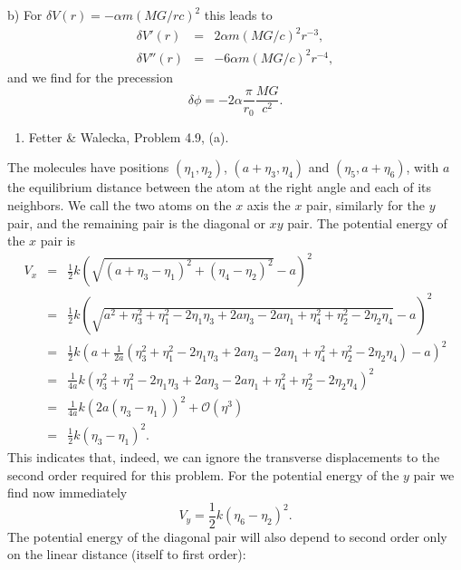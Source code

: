 \documentclass[letterpaper,11pt]{article}
\begin{document}
b) For $\delta V(r) = -\alpha m(MG/rc)^2$ this leads to
\begin{eqnarray*}
 \delta V'(r) & = & 2 \alpha m (MG/c)^2 r^{-3}, \\
 \delta V''(r) & = & - 6 \alpha m (MG/c)^2 r^{-4},
\end{eqnarray*}
and we find for the precession
\begin{equation*}
 \delta\phi = -2 \alpha \frac{\pi}{r_0} \frac{MG}{c^2}.
\end{equation*}

\begin{enumerate}[resume]
 \item Fetter \& Walecka, Problem 4.9, (a).
\end{enumerate}
The molecules have positions $(\eta_1,\eta_2)$, $(a+\eta_3,\eta_4)$ and $(\eta_5,a+\eta_6)$, with $a$ the equilibrium distance between the atom at the right angle and each of its neighbors.  We call the two atoms on the $x$ axis the $x$ pair, similarly for the $y$ pair, and the remaining pair is the diagonal or $xy$ pair.  The potential energy of the $x$ pair is
\begin{eqnarray*}
 V_x & = & \frac{1}{2} k \left( \sqrt{(a + \eta_3 - \eta_1)^2 + (\eta_4 - \eta_2)^2}  - a\right)^2 \\
   & = & \frac{1}{2} k \left( \sqrt{a^2 + \eta_3^2 + \eta_1^2 - 2\eta_1\eta_3 + 2 a \eta_3 - 2 a \eta_1 + \eta_4^2 + \eta_2^2 - 2 \eta_2 \eta_4} - a \right)^2 \\
   & = & \frac{1}{2} k \left( a + \frac{1}{2a} \left( \eta_3^2 + \eta_1^2 - 2 \eta_1 \eta_3 + 2 a \eta_3 - 2 a \eta_1 + \eta_4^2 + \eta_2^2 - 2 \eta_2 \eta_4 \right) - a\right)^2 \\
   & = & \frac{1}{4a} k \left( \eta_3^2 + \eta_1^2 - 2 \eta_1 \eta_3 + 2 a \eta_3 - 2 a \eta_1 + \eta_4^2 + \eta_2^2 - 2 \eta_2 \eta_4 \right)^2 \\
   & = & \frac{1}{4a} k \left( 2 a (\eta_3 - \eta_1) \right)^2 + \mathcal{O}(\eta^3) \\
   & = & \frac{1}{2} k (\eta_3 - \eta_1)^2.
\end{eqnarray*}
This indicates that, indeed, we can ignore the transverse displacements to the second order required for this problem.  For the potential energy of the $y$ pair we find now immediately
\begin{equation*}
 V_y = \frac{1}{2} k (\eta_6 - \eta_2)^2.
\end{equation*}
The potential energy of the diagonal pair will also depend to second order only on the linear distance (itself to first order):
\end{document}

